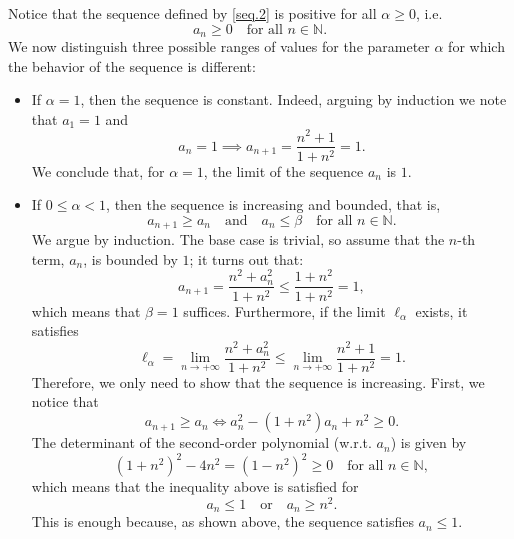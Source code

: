 \documentclass[a4paper,10 pt]{report}
\theoremstyle{definition}
\newcommand{\N}{\mathbb N}
\begin{document}
\begin{solutionBox} Notice that the sequence defined by \eqref{seq.2} is positive for all $\alpha \geq 0$, i.e.
\begin{equation*} a_n \geq 0 \quad \text{for all $n \in \N$}. \end{equation*}
We now distinguish three possible ranges of values for the parameter $\alpha$ for which the behavior of the sequence is different:

\begin{itemize}
	\item If $\alpha = 1$, then the sequence is constant. Indeed, arguing by induction we note that $a_1=1$ and
	 \begin{equation*} a_{n} = 1 \implies a_{n + 1} = \frac{n^2 + 1}{1 + n^2} = 1. \end{equation*}
We conclude that, for $\alpha = 1$, the limit of the sequence $a_n$ is $1$.

\item If $0 \le \alpha < 1$, then the sequence is increasing and bounded, that is,
\begin{equation*} a_{n + 1} \geq a_n \quad \text{and} \quad a_n \leq \beta \quad \text{for all $n \in \N$}. \end{equation*}
We argue by induction. The base case is trivial, so assume that the $n$-th term, $a_n$, is bounded by $1$; it turns out that:
\begin{equation*}a_{n + 1} = \frac{n^2 + a_n^2}{1 + n^2} \leq \frac{1 + n^2}{1 + n^2} = 1, \end{equation*}
which means that $\beta = 1$ suffices. Furthermore, if the limit $\ell_\alpha$ exists, it satisfies
\begin{equation*}\ell_\alpha = \lim_{n \to + \infty} \frac{n^2 + a_n^2}{1 + n^2} \leq \lim_{n \to + \infty} \frac{n^2 + 1}{1 + n^2} = 1. \end{equation*}
Therefore, we only need to show that the sequence is increasing. First, we notice that
\begin{equation*}a_{n + 1} \geq a_n \iff a_n^2 - (1 + n^2) a_n + n^2 \geq 0.\end{equation*}
The determinant of the second-order polynomial (w.r.t. $a_n$) is given by
\begin{equation*}(1 + n^2)^2 - 4n^2 = (1 - n^2)^2 \geq 0 \quad \text{for all $n \in \N$},\end{equation*}
which means that the inequality above is satisfied for
\begin{equation*}a_n \leq 1 \quad \text{or} \quad a_n \geq n^2.\end{equation*}
This is enough because, as shown above, the sequence satisfies $a_n \le 1$.


\end{itemize}
\end{solutionBox}
\end{document}
